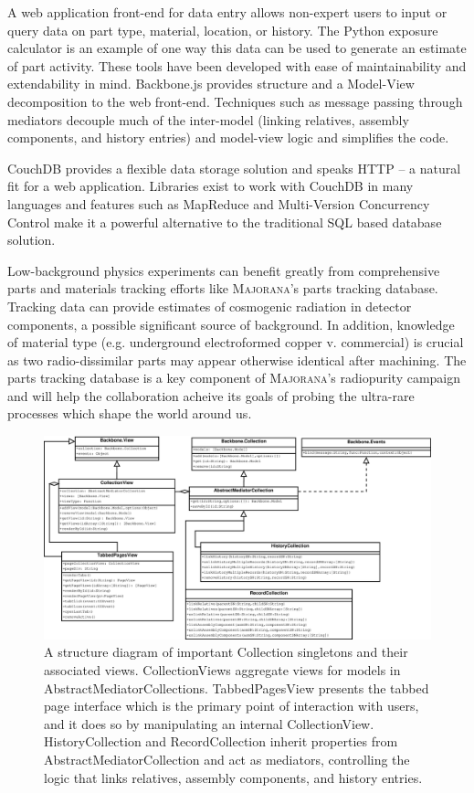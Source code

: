 \documentclass[journal]{IEEEtran}
\begin{document}
A web application front-end for data entry allows non-expert users to input
or query data on part type, material, location, or history. The Python exposure
calculator is an example of one way this data can be used to generate an estimate
of part activity. These tools have been developed with ease of maintainability and
extendability in mind. Backbone.js provides structure and a Model-View
decomposition to the web front-end. Techniques such as message passing through mediators
decouple much of the inter-model (linking relatives, assembly components, and history entries)
and model-view logic and simplifies the code.

CouchDB provides a flexible data storage solution and speaks HTTP -- a natural
fit for a web application. Libraries exist to work with CouchDB in many languages and
features such as MapReduce and Multi-Version Concurrency Control make it a powerful
alternative to the traditional SQL based database solution.

Low-background physics experiments can benefit greatly from comprehensive
parts and materials tracking efforts like \textsc{Majorana}'s parts tracking database.
Tracking data can provide estimates of cosmogenic radiation in detector components,
a possible significant source of background. In addition, knowledge of material type
(e.g. underground electroformed copper v. commercial) is crucial as two radio-dissimilar 
parts may appear otherwise identical after machining. The parts tracking database is a 
key component of \textsc{Majorana}'s radiopurity campaign and will help the collaboration acheive
its goals of probing the ultra-rare processes which shape the world around us.

\clearpage

\begin{figure}[!p]
\centering
\includegraphics[width=7.5in]{Singletons}
\caption{A structure diagram of important Collection singletons and their associated views. CollectionViews aggregate views for models in
AbstractMediatorCollections. TabbedPagesView presents the tabbed page interface which is the primary point of interaction with users, and it
does so by manipulating an internal CollectionView. HistoryCollection and RecordCollection inherit properties from AbstractMediatorCollection
and act as mediators, controlling the logic that links relatives, assembly components, and history entries.}
\label{singletons}
\end{figure}
\end{document}
